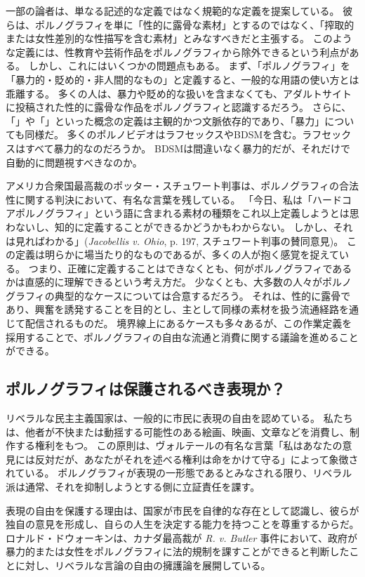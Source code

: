 \documentclass[paper=a4,book,openany]{jlreq} \usepackage{mystyle}
\begin{document}
一部の論者は、単なる記述的な定義ではなく規範的な定義を提案している。
彼らは、ポルノグラフィを単に「性的に露骨な素材」とするのではなく、「搾取的または女性差別的な性描写を含む素材」とみなすべきだと主張する。
このような定義には、性教育や芸術作品をポルノグラフィから除外できるという利点がある。
しかし、これにはいくつかの問題点もある。
まず、「ポルノグラフィ」を「暴力的・貶め的・非人間的なもの」と定義すると、一般的な用語の使い方とは乖離する。
多くの人は、暴力や貶め的な扱いを含まなくても、アダルトサイトに投稿された性的に露骨な作品をポルノグラフィと認識するだろう。
さらに、「」や「」といった概念の定義は主観的かつ文脈依存的であり、「暴力」についても同様だ。
多くのポルノビデオはラフセックスやBDSMを含む。ラフセックスはすべて暴力的なのだろうか。
BDSMは間違いなく暴力的だが、それだけで自動的に問題視すべきなのか。

アメリカ合衆国最高裁のポッター・スチュワート判事は、ポルノグラフィの合法性に関する判決において、有名な言葉を残している。
「今日、私は「ハードコアポルノグラフィ」という語に含まれる素材の種類をこれ以上定義しようとは思わないし、知的に定義することができるかどうかもわからない。
しかし、それは見ればわかる」(\emph{Jacobellis v. Ohio}, p. 197, スチュワート判事の賛同意見)。
この定義は明らかに場当たり的なものであるが、多くの人が抱く感覚を捉えている。
つまり、正確に定義することはできなくとも、何がポルノグラフィであるかは直感的に理解できるという考え方だ。
少なくとも、大多数の人々がポルノグラフィの典型的なケースについては合意するだろう。
それは、性的に露骨であり、興奮を誘発することを目的とし、主として同様の素材を扱う流通経路を通じて配信されるものだ。
境界線上にあるケースも多々あるが、この作業定義を採用することで、ポルノグラフィの自由な流通と消費に関する議論を進めることができる。

\subsection{ポルノグラフィは保護されるべき表現か？}

リベラルな民主主義国家は、一般的に市民に表現の自由を認めている。
私たちは、他者が不快または動揺する可能性のある絵画、映画、文章などを消費し、制作する権利をもつ。
この原則は、ヴォルテールの有名な言葉「私はあなたの意見には反対だが、あなたがそれを述べる権利は命をかけて守る」によって象徴されている。
ポルノグラフィが表現の一形態であるとみなされる限り、リベラル派は通常、それを抑制しようとする側に立証責任を課す。

表現の自由を保護する理由は、国家が市民を自律的な存在として認識し、彼らが独自の意見を形成し、自らの人生を決定する能力を持つことを尊重するからだ。
ロナルド・ドウォーキンは、カナダ最高裁が \emph{R. v. Butler} 事件において、政府が暴力的または女性をポルノグラフィに法的規制を課すことができると判断したことに対し、リベラルな言論の自由の擁護論を展開している。
\end{document}
